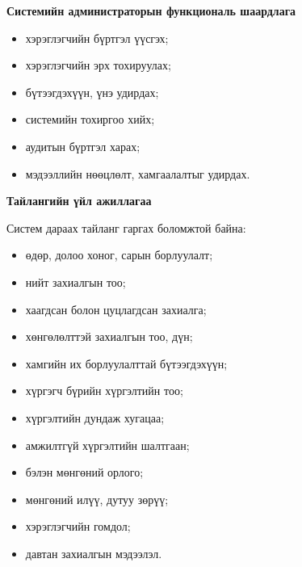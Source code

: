 \textbf{Системийн администраторын функциональ шаардлага}
\begin{itemize}
    \item хэрэглэгчийн бүртгэл үүсгэх;
    \item хэрэглэгчийн эрх тохируулах;
    \item бүтээгдэхүүн, үнэ удирдах;
    \item системийн тохиргоо хийх;
    \item аудитын бүртгэл харах;
    \item мэдээллийн нөөцлөлт, хамгаалалтыг удирдах.
\end{itemize}

\textbf{Тайлангийн үйл ажиллагаа}

Систем дараах тайланг гаргах боломжтой байна:
\begin{itemize}
    \item өдөр, долоо хоног, сарын борлуулалт;
    \item нийт захиалгын тоо;
    \item хаагдсан болон цуцлагдсан захиалга;
    \item хөнгөлөлттэй захиалгын тоо, дүн;
    \item хамгийн их борлуулалттай бүтээгдэхүүн;
    \item хүргэгч бүрийн хүргэлтийн тоо;
    \item хүргэлтийн дундаж хугацаа;
    \item амжилтгүй хүргэлтийн шалтгаан;
    \item бэлэн мөнгөний орлого;
    \item мөнгөний илүү, дутуу зөрүү;
    \item хэрэглэгчийн гомдол;
    \item давтан захиалгын мэдээлэл.
\end{itemize}

